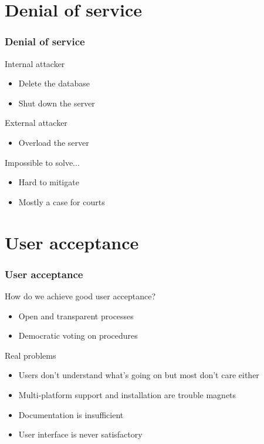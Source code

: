 \documentclass[aspectratio=1610, compress, bigger]{beamer}
\begin{document}
\section{Denial of service}
\begin{frame}\frametitle{Denial of service}

\begin{block}{Internal attacker}
\begin{itemize}
\item Delete the database
\item Shut down the server
\end{itemize}
\end{block}

\pause

\begin{block}{External attacker}
\begin{itemize}
\item Overload the server
\end{itemize}
\end{block}

\pause

\begin{alertblock}{Impossible to solve...}
\begin{itemize}
\item Hard to mitigate
\item Mostly a case for courts
\end{itemize}
\end{alertblock}

\end{frame}

\section{User acceptance}
\begin{frame}\frametitle{User acceptance}

\begin{block}{How do we achieve good user acceptance?}
\begin{itemize}
\item Open and transparent processes
\item Democratic voting on procedures
\end{itemize}
\end{block}

\pause

\begin{alertblock}{Real problems}
\begin{itemize}
\item Users don't understand what's going on but most don't care either
\item Multi-platform support and installation are trouble magnets
\item Documentation is insufficient
\item User interface is never satisfactory
\end{itemize}
\end{alertblock}

\end{frame}
\end{document}
